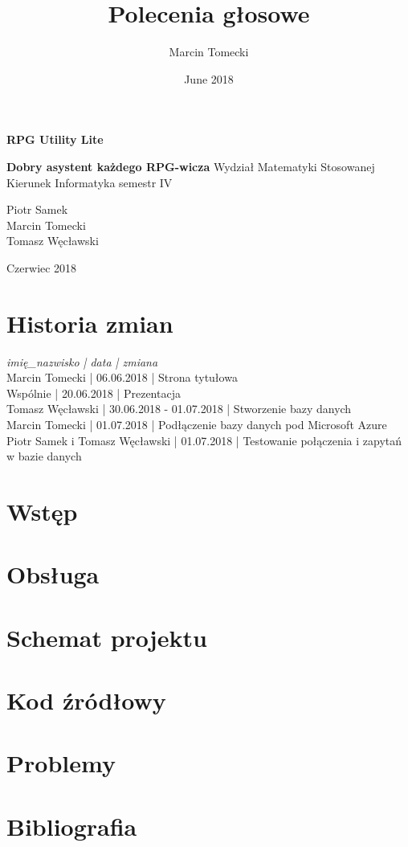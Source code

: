 \documentclass{article}
\title{Polecenia głosowe}
\author{Marcin Tomecki}
\date{June 2018}
\begin{document}
\begin{titlepage}
\centering
\Huge \textbf{RPG Utility Lite}\par
\Large \textbf{Dobry asystent każdego RPG-wicza}
\vfill
Wydział Matematyki Stosowanej\\Kierunek Informatyka semestr IV\par
\vfill
\vfill
\begin{flushright}
Piotr Samek\\
Marcin Tomecki\\
Tomasz Węcławski
\end{flushright}
Czerwiec 2018
\end{titlepage}
\tableofcontents
\newpage
\clearpage
\section{Historia zmian}
\textit{imię\_nazwisko | data | zmiana}\\
Marcin Tomecki                 | 06.06.2018              | Strona tytułowa\\
Wspólnie                       | 20.06.2018              | Prezentacja\\
Tomasz Węcławski               | 30.06.2018 - 01.07.2018 | Stworzenie bazy danych\\
Marcin Tomecki                 | 01.07.2018              | Podłączenie bazy danych pod Microsoft Azure\\
Piotr Samek i Tomasz Węcławski | 01.07.2018              | Testowanie połączenia i zapytań w bazie danych

\section{Wstęp}

\section{Obsługa}

\section{Schemat projektu}

\section{Kod źródłowy}

\section{Problemy}

\section{Bibliografia}
\end{document}
